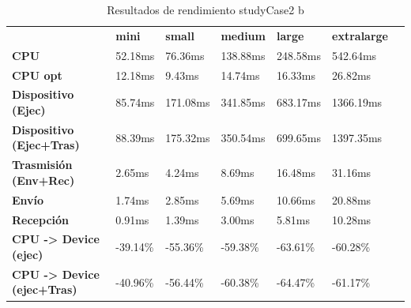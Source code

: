 \begin{table}[H]
    \centering
    \begin{tabular}{lllllll}
    \rowcolor[HTML]{DAE8FC} \ &  \textbf{mini} &  \textbf{small} &  \textbf{medium} &  \textbf{	large} &  \textbf{	extralarge} \\
    \cellcolor[HTML]{DAE8FC} \textbf{CPU} & 52.18ms & 76.36ms & 138.88ms & 	248.58ms & 	542.64ms \\
    \rowcolor[HTML]{EFEFEF} \cellcolor[HTML]{DAE8FC} \textbf{CPU opt} & 12.18ms & 9.43ms & 14.74ms & 	16.33ms & 	26.82ms \\
    \cellcolor[HTML]{DAE8FC} \textbf{Dispositivo (Ejec)} & 85.74ms & 171.08ms & 341.85ms & 	683.17ms & 	1366.19ms \\
    \rowcolor[HTML]{EFEFEF} \cellcolor[HTML]{DAE8FC} \textbf{Dispositivo (Ejec+Tras)} & 88.39ms & 175.32ms & 350.54ms & 	699.65ms & 	1397.35ms \\
    \cellcolor[HTML]{DAE8FC} \textbf{Trasmisión (Env+Rec)} & 2.65ms & 4.24ms & 8.69ms & 	16.48ms & 	31.16ms \\
    \rowcolor[HTML]{EFEFEF} \cellcolor[HTML]{DAE8FC} \textbf{Envío} & 1.74ms & 2.85ms & 5.69ms & 	10.66ms & 	20.88ms \\
    \cellcolor[HTML]{DAE8FC} \textbf{Recepción} & 0.91ms & 1.39ms & 3.00ms & 	5.81ms & 	10.28ms \\
    \rowcolor[HTML]{EFEFEF} \cellcolor[HTML]{DAE8FC} \textbf{CPU -> Device (ejec)} & -39.14\% & -55.36\% & -59.38\% & 	-63.61\% & 	-60.28\% \\
    \cellcolor[HTML]{DAE8FC} \textbf{CPU -> Device (ejec+Tras)} & -40.96\% & -56.44\% & -60.38\% & 	-64.47\% & 	-61.17\% \\
    \end{tabular}
    \caption[Resultados de rendimiento studyCase2 b]{{Resultados de rendimiento studyCase2 b}}
    \label{table_test_studyCase2_b_hw_performanceResults}
\end{table}
